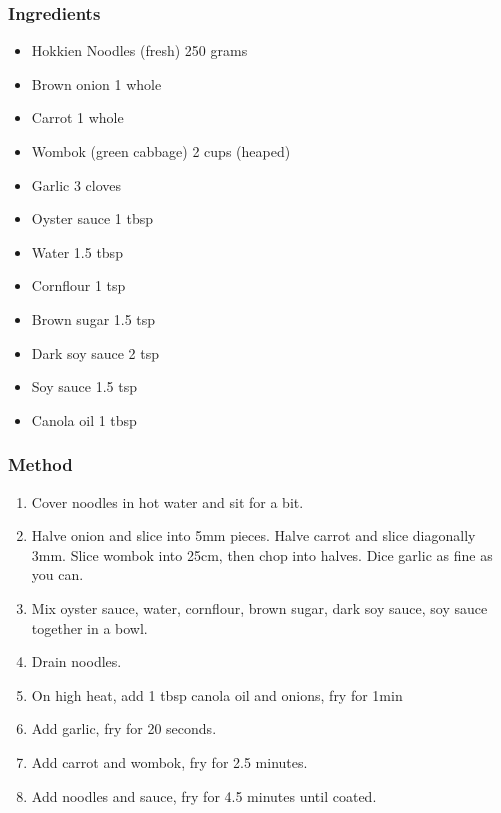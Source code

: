 \documentclass[]{article}
\begin{document}
\subsubsection*{\Large Ingredients}
\begin{multicols}{2}
\begin{itemize}
 \item Hokkien Noodles (fresh) \hfill 250 grams
 \item Brown onion \hfill 1 whole
 \item Carrot \hfill 1 whole
 \item Wombok (green cabbage) \hfill 2 cups (heaped)
 \item Garlic \hfill 3 cloves
 \item Oyster sauce \hfill 1 tbsp
 \item Water \hfill 1.5 tbsp
 \item Cornflour \hfill 1 tsp
 \item Brown sugar \hfill 1.5 tsp
 \item Dark soy sauce \hfill 2 tsp
 \item Soy sauce \hfill 1.5 tsp
 \item Canola oil \hfill 1 tbsp
\end{itemize}
\end{multicols}
\subsubsection*{\Large Method}
\begin{enumerate}[font=\huge\color{accent}]
	\item Cover noodles in hot water and sit for a bit.
	\item Halve onion and slice into 5mm pieces. Halve carrot and slice diagonally 3mm. Slice wombok into 25cm, then chop into halves. Dice garlic as fine as you can.
	\item Mix oyster sauce, water, cornflour, brown sugar, dark soy sauce, soy sauce together in a bowl.
	\item Drain noodles.
	\item On high heat, add 1 tbsp canola oil and onions, fry for 1min
	\item Add garlic, fry for 20 seconds.
	\item Add carrot and wombok, fry for 2.5 minutes.
	\item Add noodles and sauce, fry for 4.5 minutes until coated.
\end{enumerate}
\newpage
{}\label{rec:Pad See Ew}
\end{document}

